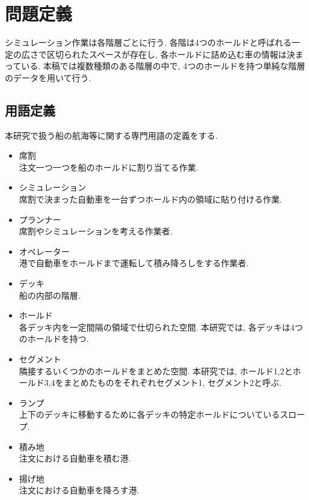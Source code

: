 \graphicspath{{./sozai/}}
\chapter{問題定義}\label{definition}

シミュレーション作業は各階層ごとに行う.
各階は4つのホールドと呼ばれる一定の広さで区切られたスペースが存在し, 各ホールドに詰め込む車の情報は決まっている.
本稿では複数種類のある階層の中で, 4つのホールドを持つ単純な階層のデータを用いて行う.


\section{用語定義}
本研究で扱う船の航海等に関する専門用語の定義をする\cite{takeda}.

\begin{itemize}
    \item 席割 \\
    注文一つ一つを船のホールドに割り当てる作業.

    \item シミュレーション \\
    席割で決まった自動車を一台ずつホールド内の領域に貼り付ける作業.

    \item  プランナー \\
    席割やシミュレーションを考える作業者.

    \item  オペレーター\\
    港で自動車をホールドまで運転して積み降ろしをする作業者.

    \item デッキ \\
    船の内部の階層.

    \item ホールド \\
    各デッキ内を一定間隔の領域で仕切られた空間.
    本研究では, 各デッキは4つのホールドを持つ.

    \item セグメント \\
    隣接するいくつかのホールドをまとめた空間.
    本研究では, ホールド1,2とホールド3,4をまとめたものをそれぞれセグメント1, セグメント2と呼ぶ.

    \item ランプ \\
    上下のデッキに移動するために各デッキの特定ホールドについているスロープ.

    \item 積み地 \\
    注文における自動車を積む港.

    \item 揚げ地 \\
    注文における自動車を降ろす港.

\end{itemize}


